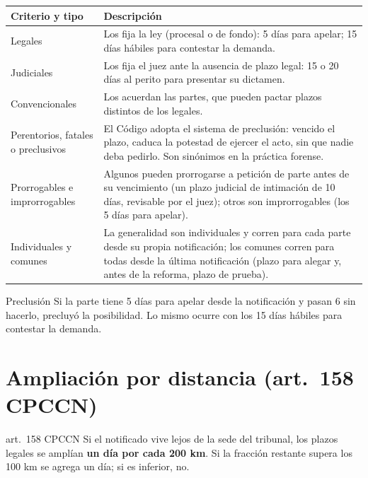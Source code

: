 \documentclass[12pt,oneside]{book}
\renewcommand{\arraystretch}{1.15}
\begin{document}
\begin{table}[H]
\centering
\renewcommand{\arraystretch}{1.25}
\begin{tabularx}{\textwidth}{>{\RaggedRight\arraybackslash}p{}>{\RaggedRight\arraybackslash}X}
\toprule
\textbf{Criterio y tipo} & \textbf{Descripción} \\
\midrule
Legales & Los fija la ley (procesal o de fondo): 5 días para apelar; 15 días hábiles para contestar la demanda. \\
\addlinespace
Judiciales & Los fija el juez ante la ausencia de plazo legal: 15 o 20 días al perito para presentar su dictamen. \\
\addlinespace
Convencionales & Los acuerdan las partes, que pueden pactar plazos distintos de los legales. \\
\addlinespace
Perentorios, fatales o preclusivos & El Código adopta el sistema de preclusión: vencido el plazo, caduca la potestad de ejercer el acto, sin que nadie deba pedirlo. Son sinónimos en la práctica forense. \\
\addlinespace
Prorrogables e improrrogables & Algunos pueden prorrogarse a petición de parte antes de su vencimiento (un plazo judicial de intimación de 10 días, revisable por el juez); otros son improrrogables (los 5 días para apelar). \\
\addlinespace
Individuales y comunes & La generalidad son individuales y corren para cada parte desde su propia notificación; los comunes corren para todas desde la última notificación (plazo para alegar y, antes de la reforma, plazo de prueba). %
\\
\bottomrule
\end{tabularx}
\end{table}

\begin{example}{Preclusión}
Si la parte tiene 5 días para apelar desde la notificación y pasan 6 sin hacerlo, precluyó la posibilidad. Lo mismo ocurre con los 15 días hábiles para contestar la demanda.
\end{example}

\section{Ampliación por distancia (art.~158 CPCCN)}

\begin{norma}{art.~158 CPCCN}
Si el notificado vive lejos de la sede del tribunal, los plazos legales se amplían \textbf{un día por cada 200 km}. Si la fracción restante supera los 100 km se agrega un día; si es inferior, no.
\end{norma}
\end{document}
